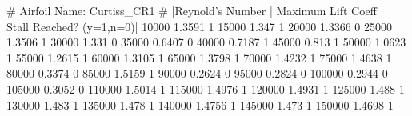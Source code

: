 # Airfoil Name: Curtiss_CR1
# |Reynold's Number | Maximum Lift Coeff | Stall Reached? (y=1,n=0)|
10000 1.3591 1
15000 1.347 1
20000 1.3366 0
25000 1.3506 1
30000 1.331 0
35000 0.6407 0
40000 0.7187 1
45000 0.813 1
50000 1.0623 1
55000 1.2615 1
60000 1.3105 1
65000 1.3798 1
70000 1.4232 1
75000 1.4638 1
80000 0.3374 0
85000 1.5159 1
90000 0.2624 0
95000 0.2824 0
100000 0.2944 0
105000 0.3052 0
110000 1.5014 1
115000 1.4976 1
120000 1.4931 1
125000 1.488 1
130000 1.483 1
135000 1.478 1
140000 1.4756 1
145000 1.473 1
150000 1.4698 1
